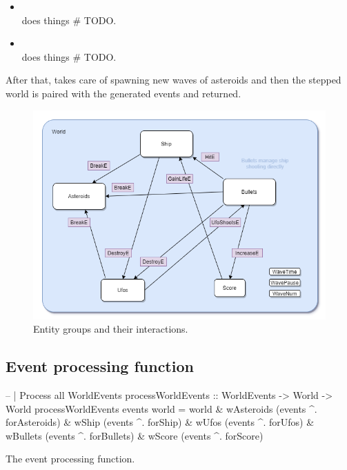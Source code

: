 \documentclass[
  digital, %
  color,   %
  table,   %
  oneside, %
  lof,     %
  lot,     %
]{fithesis3}
\begin{document}
{\begin{itemize}
    \item {}\\
    does things \# TODO.

    \item {}\\
    does things \# TODO.
\end{itemize}
After that,  takes care of spawning new waves of asteroids
and then the stepped world is paired with the generated events and returned.

\begin{figure}
    \centering
    \includegraphics[width=\textwidth]{images/entity-relationships-transparent-bg.png}
    \caption{Entity groups and their interactions.}
    \label{fig:entitygroups}
\end{figure}


\subsection{Event processing function}

\begin{listing}
\begin{haskell}
-- | Process all WorldEvents
processWorldEvents :: WorldEvents -> World -> World
processWorldEvents events world =
    world
      & wAsteroids %
                        (events ^. forAsteroids)
      & wShip      %
                        (events ^. forShip)
      & wUfos      %
                        (events ^. forUfos)
      & wBullets   %
                        (events ^. forBullets)
      & wScore     %
                        (events ^. forScore)
\end{haskell}
\caption{The event processing function.}
\label{lst:pureprocessevents}
\end{listing}

}
\end{document}
